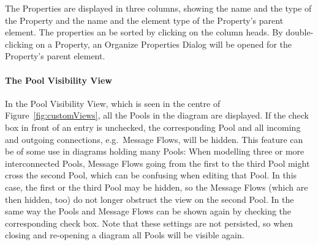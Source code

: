 The Properties are displayed in three columns, showing the name and the type of the Property and the
name and the element type of the Property's parent element. The properties an be sorted by clicking
on the column heads. By double-clicking on a Property, an Organize Properties Dialog will be opened
for the Property's parent element.


\paragraph*{The Pool Visibility View}

In the Pool Visibility View, which is seen in the centre of Figure~\ref{fig:customViews}, all the
Pools in the diagram are displayed. If the check box in front of an entry is unchecked, the
corresponding Pool and all incoming and outgoing connections, e.g.\ Message Flows, will be hidden.
This feature can be of some use in diagrams holding many Pools: When modelling three or more
interconnected Pools, Message Flows going from the first to the third Pool might cross the second
Pool, which can be confusing when editing that Pool. In this case, the first or the third Pool may
be hidden, so the Message Flows (which are then hidden, too) do not longer obstruct the view on the
second Pool. In the same way the Pools and Message Flows can be shown again by checking the
corresponding check box. Note that these settings are not persisted, so when closing and re-opening
a diagram all Pools will be visible again. 




